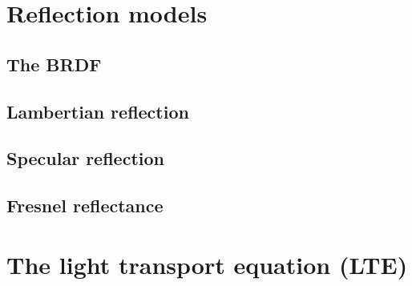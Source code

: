 \section{Reflection models}

\subsection{The BRDF}

\subsection{Lambertian reflection}

\subsection{Specular reflection}

\subsection{Fresnel reflectance}

\section{The light transport equation (LTE)}

